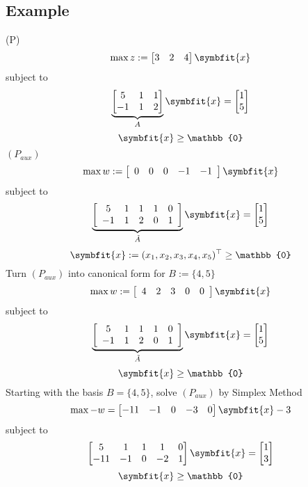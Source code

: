 \subsection{Example}
(P)
\[ \max z:=\begin{bmatrix} 3 & 2 & 4 \end{bmatrix} \symbfit{x} \]
subject to
\[
    \underbrace{
    \begin{bmatrix}
        5 & 1 & 1\\
        -1 & 1 & 2\\
    \end{bmatrix}}_{A}
    \symbfit{x}=
    \begin{bmatrix}
        1\\
        5
    \end{bmatrix}
\]
\[\symbfit{x}\ge \mathbb{0}\]
$ (P_{aux}) $ 
\[ \max w:=\left[\begin{array}{ccccc}
0 & 0 & 0 & -1 & -1
\end{array}\right] \symbfit{x} \]
subject to
\[
    \underbrace{\left[
    \begin{array}{ccccc}
        5 & 1 & 1 & 1 & 0\\
        -1 & 1 & 2 & 0 & 1
    \end{array}\right]}_{\tilde{A}}
    \symbfit{x}=
    \begin{bmatrix}
        1\\
        5
    \end{bmatrix}
\]
\[ \symbfit{x}:=(x_1,x_2,x_3,x_4,x_5)^\top \ge \mathbb{0} \]
Turn $ (P_{aux}) $ into canonical form for $ B:=\{4,5\} $
\[ \max w:=\left[\begin{array}{ccccc}
4 & 2 & 3 & 0 & 0
\end{array}\right] \symbfit{x} \]
subject to
\[
    \underbrace{\left[
    \begin{array}{ccccc}
        5 & 1 & 1 & 1 & 0\\
        -1 & 1 & 2 & 0 & 1
    \end{array}\right]}_{\tilde{A}}
    \symbfit{x}=
    \begin{bmatrix}
        1\\
        5
    \end{bmatrix}
\]
\[ \symbfit{x}\ge \mathbb{0} \]
Starting with the basis $ B=\{4,5\} $, solve $ (P_{aux}) $
by Simplex Method
\[ \max -w=\begin{bmatrix}-11 & -1 & 0 & -3 & 0\end{bmatrix} \symbfit{x} - 3 \]
subject to
\[
    \begin{bmatrix}
        5 & 1 & 1 & 1 & 0\\
        -11 & -1 & 0 & -2 & 1
    \end{bmatrix}
    \symbfit{x}=
    \begin{bmatrix}
        1\\
        3
    \end{bmatrix}
\]
\[ \symbfit{x}\ge \mathbb{0} \]

